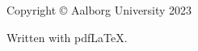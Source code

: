 \thispagestyle{empty}
{\small
\strut\vfill %
\noindent Copyright \copyright{} Aalborg University 2023\par
\vspace{0.2cm}
\noindent Written with pdf\LaTeX.}
\clearpage